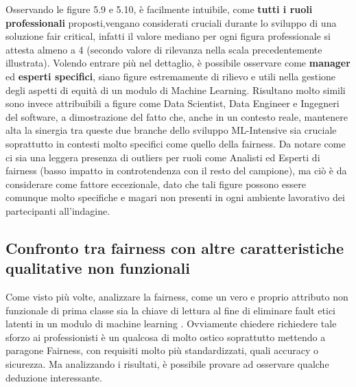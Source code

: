 	 
	 Osservando le figure 5.9 e 5.10, è facilmente intuibile, come \textbf{tutti i ruoli professionali} proposti,vengano considerati cruciali durante lo sviluppo di una soluzione fair critical, infatti il valore mediano per ogni figura professionale si attesta almeno a 4 (secondo valore di rilevanza nella scala precedentemente illustrata). Volendo entrare più nel dettaglio, è possibile osservare come \textbf{manager} ed \textbf{esperti specifici}, siano figure estremamente di rilievo e utili nella gestione degli aspetti di equità di un modulo di Machine Learning. Risultano molto simili sono invece attribuibili a figure come Data Scientist, Data Engineer e Ingegneri del software, a dimostrazione del fatto che, anche in un contesto reale, mantenere alta la sinergia tra queste due branche dello sviluppo ML-Intensive sia cruciale soprattutto in contesti molto specifici come quello della fairness. Da notare come ci sia una leggera presenza di outliers per ruoli come Analisti ed Esperti di fairness (basso impatto in controtendenza con il resto del campione), ma ciò è da considerare come fattore eccezionale, dato che tali figure possono essere comunque molto specifiche e magari non presenti in ogni ambiente lavorativo dei partecipanti all'indagine.
    \subsection{Confronto tra fairness con altre caratteristiche qualitative non funzionali}
    
    \begin{center}
		\hspace*{-5mm}%
	\end{center}
	Come visto più volte, analizzare la fairness, come un vero e proprio attributo non funzionale di prima classe sia la chiave di lettura al fine di eliminare fault etici latenti in un modulo di machine learning \cite{brun2018software}. Ovviamente chiedere richiedere tale sforzo ai professionisti è un qualcosa di molto ostico soprattutto mettendo a paragone Fairness, con requisiti molto più standardizzati, quali accuracy o sicurezza. Ma analizzando i risultati, è possibile provare ad osservare qualche deduzione interessante.\\
	
